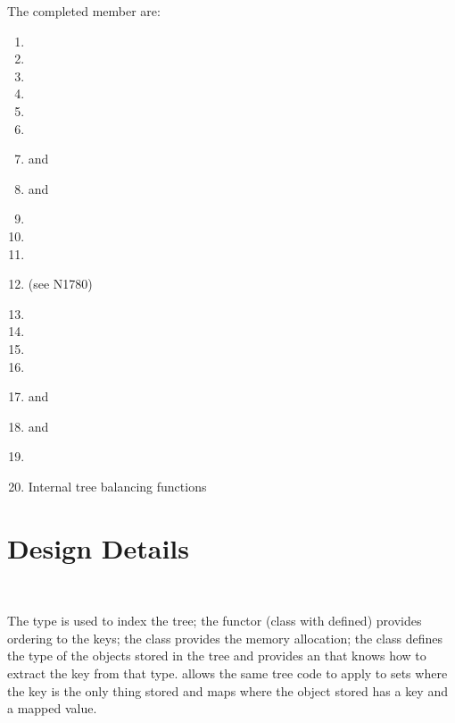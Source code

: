 The completed member are:

\begin{enumerate}
\item {}
\item {}
\item {}
\item {}
\item {}
\item {}
\item {} and 
\item {} and 
\item {}
\item {}
\item {}
\item {} (see N1780)
\item {}
\item {}
\item {}
\item {}
\item {} and 
\item {} and 
\item {}
\item Internal tree balancing functions
\end{enumerate}

\section{Design Details}

\\

The type  is used to index the tree; the functor 
(class with  defined) provides ordering to the keys; the
class  provides the memory allocation; the class
 defines the type of the objects stored in the tree and
provides an  that knows how to extract the key from that
type.  allows the same tree code to apply to sets where the
key is the only thing stored and maps where the object stored has a key and a
mapped value.

